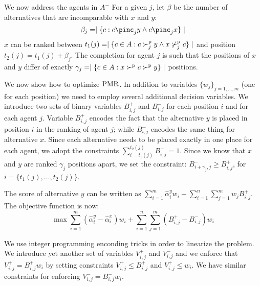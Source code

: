 We now address the agents in $A^{-}$
For a given $j$, let $\beta$ be the number of alternatives that are incomparable with $x$ and $y$:
\[ \beta_{j} = \mid \{ c : c \pinc_{j} y \wedge c \pinc_{j} x \} \mid \]
$x$ can be ranked between $t_{1}(j)=\mid \{ c \in A : c \succ^\text{p}_{j} y \wedge x \nsucc^\text{p}_{j} c \} \mid $ and position $t_{2}(j)=t_{1}(j)+\beta_{j}$.
The completion for agent $j$ is such that the positions of $x$ and $y$ differ of exactly $\gamma_{j} =
\mid \{ c \in A : x \succ^\text{p} c \succ^\text{p} y \} \mid$ positions.


We now show how to optimize $\operatorname{PMR}$.
In addition to variables $\{ w_{j} \}_{j=1,\ldots,m}$ (one for each position) we need to employ several additional decision variables.
We introduce two sets of binary variables $B^{+}_{i,j}$ and $B^{-}_{i,j}$  for each position $i$ and for each agent $j$.
Variable $B_{i,j}^{+}$ encodes the fact that the alternative $y$ is placed in position $i$ in the ranking of agent $j$; while  $B_{i,j}^{-}$ encodes the same thing for alternative $x$.
Since each alternative needs to be placed exactly in one place for each agent, we adopt the constraints
$\sum_{i=t_{1}(j)}^{t_{2}(j)} B_{i,j}^{+} = 1$.
Since we know that $x$ and $y$ are ranked $\gamma_{j}$ positions apart, we set the constraint:
$B_{i+\gamma_{j},j}^{-} \geq B_{i,j}^{+}$,  for $i = \{ t_{1}(j), \ldots, t_{2}(j)\}$.


The score of alternative $y$ can be written as $\sum_{i = 1}^{m} \hat{\alpha}_{i}^{y}  w_{i} + \sum_{i=1}^{n} \sum_{j=1}^{m} w_{j} B_{i,j}^{+}$.
The objective function is now:
 \[ \max \sum_{i = 1}^{m} (\hat{\alpha}_{i}^{y} - \hat{\alpha}_{i}^{x}) w_{i} +  \sum_{i=1}^{n} \sum_{j=1}^{m} (B_{i,j}^{+} - B_{i,j}^{-})  w_i \]

We use integer programming enconding tricks in order to linearize the problem.
We introduce yet another set of variables  $V_{i,j}^{+} $  and $V_{i,j}^{-}$ %
and we enforce that $V_{i,j}^{+} = B^{+}_{i,j} w_i$ by setting constraints $V_{i,j}^{+} \leq B^{+}_{i,j}$ and $V_{i,j}^{+}  \leq w_i$.
We have similar constraints for enforcing $V_{i,j}^{-} = B^{-}_{i,j} w_i$.

